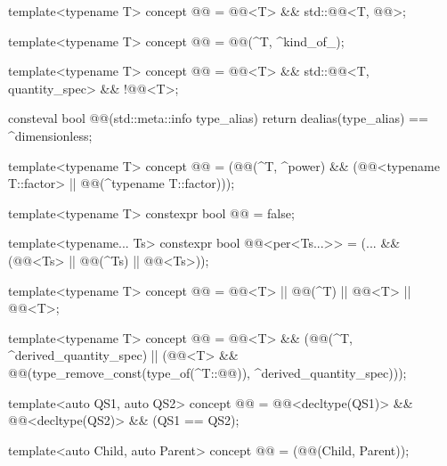 \begin{itemdecl}
template<typename T>
concept @@ = @@<T> && std::@@<T, @@>;

template<typename T>
concept @@ = @@(^T, ^kind_of_);

template<typename T>
concept @@ =
  @@<T> && std::@@<T, quantity_spec> && !@@<T>;

consteval bool @@(std::meta::info type_alias) {
  return dealias(type_alias) == ^dimensionless;
}

template<typename T>
concept @@ =
  (@@(^T, ^power) &&
   (@@<typename T::factor> || @@(^typename T::factor)));

template<typename T>
constexpr bool @@ = false;

template<typename... Ts>
constexpr bool @@<per<Ts...>> =
  (... && (@@<Ts> || @@(^Ts) || @@<Ts>));

template<typename T>
concept @@ = @@<T> || @@(^T) ||
                                  @@<T> || @@<T>;

template<typename T>
concept @@ =
  @@<T> &&
  (@@(^T, ^derived_quantity_spec) ||
   (@@<T> && @@(type_remove_const(type_of(^T::@@)),
                                                ^derived_quantity_spec)));

template<auto QS1, auto QS2>
concept @@ =
  @@<decltype(QS1)> && @@<decltype(QS2)> && (QS1 == QS2);

template<auto Child, auto Parent>
concept @@ = (@@(Child, Parent));


\end{itemdecl}
